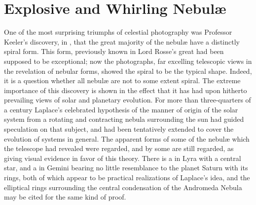 \chapter{Explosive and Whirling Nebul{\ae}}

\MyDroppedCaps O{\sc ne} of the most surprising triumphs of celestial photography was 
Professor Keeler's discovery, in {}, that the great majority of the
nebul{\ae} have a distinctly spiral form. This form, previously known
in Lord Rosse's great  had been supposed to
be exceptional; now the photographs, far excelling telescopic views in
the revelation of nebular forms, showed the spiral to be the typical
shape. Indeed, it is a question whether all nebul{\ae} are not to some
extent spiral. The extreme importance of this discovery is shown in
the effect that it has had upon hitherto prevailing views of solar and
planetary evolution. For more than three-quarters of a century
Laplace's celebrated hypothesis of the manner of origin of the solar
system from a rotating and contracting nebula surrounding the sun had
guided speculation on that subject, and had been tentatively extended
to cover the evolution of systems in general. The apparent forms of
some of the nebul{\ae} which the telescope had revealed were regarded,
and by some are still regarded, as giving visual evidence in favor of
this theory. There is a  in Lyra with a central
star, and a  in Gemini bearing no little
resemblance to the planet Saturn with its rings, both of which appear
to be practical realizations of Laplace's idea, and the elliptical
rings surrounding the central condensation of the Andromeda Nebula may
be cited for the same kind of proof.


